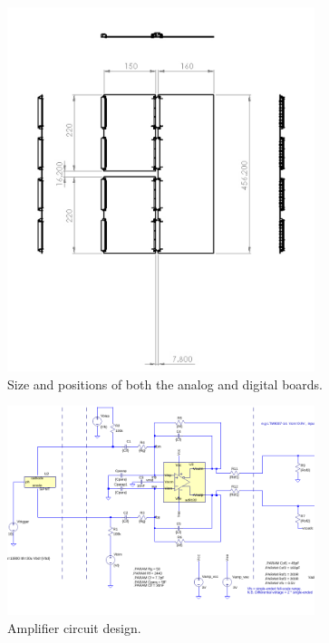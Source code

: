 \documentclass[a4paper]{article}
\begin{document}
\begin{figure}[h]
    \begin{center}
        \includegraphics[width=0.8\textwidth]{imgs/Amplifier_Board_Pair_2D}
        \caption{Size and positions of both the analog and digital boards.}
        \label{fig:analogdigitalboardsize}
    \end{center}
\end{figure}


\begin{figure}[h]
    \begin{center}
        \includegraphics[width=0.8\textwidth]{imgs/SiPM_test_dc_schematic}
        \caption{Amplifier circuit design.}
        \label{fig:amplifiercircuit}
    \end{center}
\end{figure}
\end{document}
